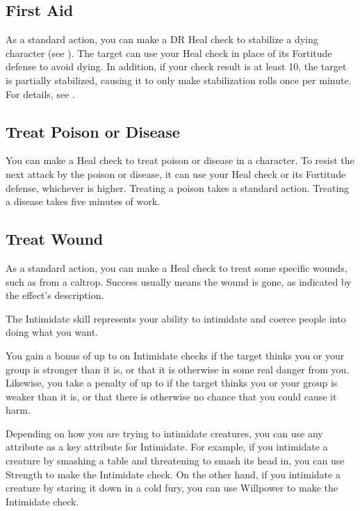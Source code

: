     \subsection{First Aid}
        As a standard action, you can make a DR Heal check to stabilize a dying character (see ). The target can use your Heal check in place of its Fortitude defense to avoid dying. In addition, if your check result is at least 10, the target is partially stabilized, causing it to only make stabilization rolls once per minute.
        For details, see .

    \subsection{Treat Poison or Disease}
        You can make a Heal check to treat poison or disease in a character.
        To resist the next attack by the poison or disease, it can use your Heal check or its Fortitude defense, whichever is higher.
        Treating a poison takes a standard action. Treating a disease takes five minutes of work.

    \subsection{Treat Wound}
        As a standard action, you can make a Heal check to treat some specific wounds, such as from a caltrop. Success usually means the wound is gone, as indicated by the effect's description.

\newpage
{}
        The Intimidate skill represents your ability to intimidate and coerce people into doing what you want.

        You gain a bonus of up to  on Intimidate checks if the target thinks you or your group is stronger than it is, or that it is otherwise in some real danger from you. Likewise, you take a penalty of up to  if the target thinks you or your group is weaker than it is, or that there is otherwise no chance that you could cause it harm.

        Depending on how you are trying to intimidate creatures, you can use any attribute as a key attribute for Intimidate.
        For example, if you intimidate a creature by smashing a table and threatening to smash its head in, you can use Strength to make the Intimidate check.
        On the other hand, if you intimidate a creature by staring it down in a cold fury, you can use Willpower to make the Intimidate check.

